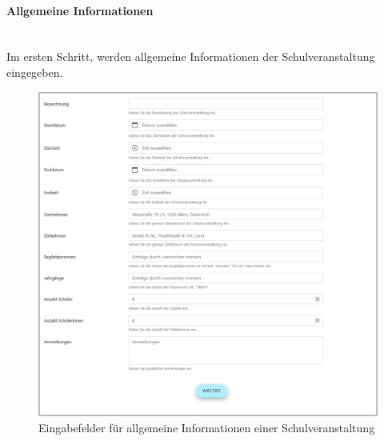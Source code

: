 \paragraph{Allgemeine Informationen}~\\
Im ersten Schritt, werden allgemeine Informationen der Schulveranstaltung eingegeben.
\begin{figure}[H]
	\centering
	\includegraphics[width=1\linewidth]{images/rfoster_implementierung/schoolgeneral}
	\caption[Schulveranstaltung]{Eingabefelder für allgemeine Informationen einer Schulveranstaltung}
	\label{fig:schoolgeneral}
\end{figure}
